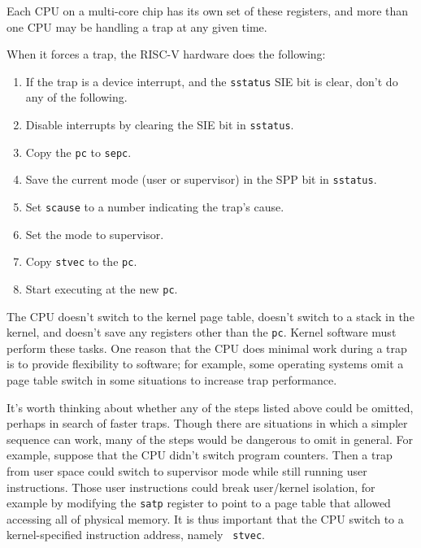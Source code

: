 Each CPU on a multi-core chip has its own set of these registers,
and more than one CPU may be handling a trap at any given time.

When it forces a trap, the RISC-V hardware does the following:

\begin{enumerate}

\item If the trap is a device interrupt, and the {\tt sstatus} SIE bit
  is clear, don't do any of the following.

\item Disable interrupts by clearing the SIE bit in {\tt sstatus}.

\item Copy the {\tt pc} to {\tt sepc}.

\item Save the current mode (user or supervisor) in the SPP bit in {\tt sstatus}.

\item Set {\tt scause} to a number indicating the trap's cause.

\item Set the mode to supervisor.

\item Copy {\tt stvec} to the {\tt pc}.

\item Start executing at the new {\tt pc}.

\end{enumerate}

The CPU doesn't switch to the kernel page table, doesn't
switch to a stack in the kernel, and doesn't save any registers other
than the {\tt pc}. Kernel software must perform these tasks.
One reason that the CPU does minimal work during a trap is to provide
flexibility to software; for example, some operating systems 
omit a page table switch in some situations to increase
trap performance.

It's worth thinking about whether any of the steps listed above could
be omitted, perhaps in search of faster traps. Though there are
situations in which a simpler sequence can work, many of the steps
would be dangerous to omit in general. For example, suppose that the
CPU didn't switch program counters. Then a trap from user space could
switch to supervisor mode while still running user instructions. Those
user instructions could break user/kernel isolation, for example
by modifying the {\tt satp} register to point to a page table that
allowed accessing all of physical memory. It is thus important that
the CPU switch to a kernel-specified instruction address, namely {\tt
  stvec}.

